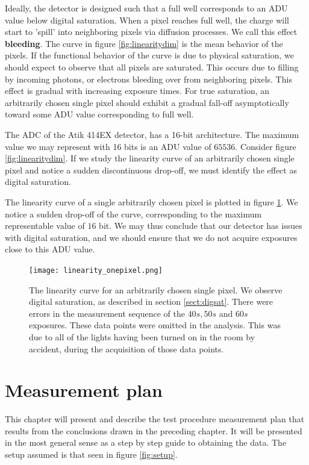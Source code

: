 \documentclass[../main.tex]{subfiles}
\begin{document}
		Ideally, the detector is designed such that a full well corresponds to an ADU value below digital saturation. When a pixel reaches full well, the charge will start to 'spill' into neighboring pixels via diffusion processes. We call this effect \textbf{bleeding}. The curve in figure \ref{fig:linearitydim} is the mean behavior of the pixels. If the functional behavior of the curve is due to physical saturation, we should expect to observe that all pixels are saturated. This occurs due to filling by incoming photons, or electrons bleeding over from neighboring pixels. This effect is gradual with increasing exposure times. For true saturation, an arbitrarily chosen single pixel should exhibit a gradual fall-off asymptotically toward some ADU value corresponding to full well. 
		
		The ADC of the Atik 414EX detector, has a 16-bit architecture. The maximum value we may represent with 16 bits is an ADU value of $65536$. Consider figure \ref{fig:linearitydim}. If we study the linearity curve of an arbitrarily chosen single pixel and notice a sudden discontinuous drop-off, we must identify the effect as digital saturation. 
		
		The linearity curve of a single arbitrarily chosen pixel is plotted in figure \ref{fig:linearitydimonepix}. We notice a sudden drop-off of the curve, corresponding to the maximum representable value of $16$ bit. We may thus conclude that our detector has issues with digital saturation, and we should ensure that we do not acquire exposures close to this ADU value.
		
		\begin{figure}[h!]
			\centering			\texttt{[image: linearity\_onepixel.png]}
			\caption{The linearity curve for an arbitrarily chosen single pixel. We observe digital saturation, as described in section \ref{sect:digsat}. There were errors in the measurement sequence of the $40s, 50s$ and $60s$ exposures. These data points were omitted in the analysis. This was due to all of the lights having been turned on in the room by accident, during the acquisition of those data points.}
			\label{fig:linearitydimonepix}
		\end{figure}
		
		\clearpage
		\section{Measurement plan} \label{sec:charmeasplan}
		This chapter will present and describe the test procedure measurement plan that results from the conclusions drawn in the preceding chapter. It will be presented in the most general sense as a step by step guide to obtaining the data. The setup assumed is that seen in figure \ref{fig:setup}.
		
\end{document}
